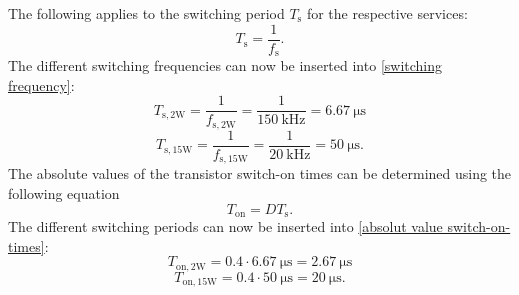  \begin{solutionblock}
 The following applies to the switching period $T_\mathrm{s}$ for the respective services:  
 \begin{equation}
    T_\mathrm{s} = \frac{1}{f_\mathrm{s}}. \label{switching frequency}
 \end{equation}
 The different switching frequencies can now be inserted into \ref{switching frequency}:
 \begin{equation}
    T_\mathrm{s,2W} =\frac{1}{f_{\mathrm{s,2W}}} = \frac{1}{\SI{150}{\kilo \hertz}}= \SI{6.67}{\micro \s}
 \end{equation}
 \begin{equation}
    T_\mathrm{s,15W} =\frac{1}{f_{\mathrm{s,15W}}} = \frac{1}{\SI{20}{\kilo \hertz}}= \SI{50}{\micro \s}.
 \end{equation}
 The absolute values of the transistor switch-on times can be determined using the following equation
 \begin{equation}
    T_\mathrm{on} = D T_\mathrm{s}. \label{absolut value switch-on-times}
 \end{equation}
 The different switching periods can now be inserted into \ref{absolut value switch-on-times}:
 \begin{equation}
    T_\mathrm{on,2W} = 0.4 \cdot \SI{6.67}{\micro \s} = \SI{2.67}{\micro \s}
 \end{equation}
 \begin{equation}
    T_\mathrm{on,15W} = 0.4 \cdot \SI{50}{\micro \s}= \SI{20}{\micro \s}.
 \end{equation}
 \end{solutionblock}

\begin{solutionblock}
       
\end{solutionblock}
    
 
